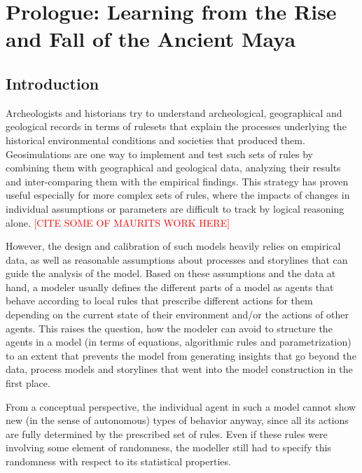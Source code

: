 \chapter{Prologue: Learning from the Rise and Fall of the Ancient Maya}
\label{chapter:maya}

\section{Introduction}

Archeologists and historians try to understand archeological, geographical and geological records in terms of rulesets that explain the processes underlying the historical environmental conditions and societies that produced them.
Geosimulations are one way to implement and test such sets of rules by combining them with geographical and geological data, analyzing their results and inter-comparing them with the empirical findings. This strategy has proven useful especially for more complex sets of rules, where the impacts of changes in individual assumptions or parameters are difficult to track by logical reasoning alone. \textcolor{red}{[CITE SOME OF MAURITS WORK HERE]}

However, the design and calibration of such models heavily relies on empirical data, as well as reasonable assumptions about processes and storylines that can guide the analysis of the model. Based on these assumptions and the data at hand, a modeler usually defines the different parts of a model as agents that behave according to local rules that prescribe different actions for them depending on the current state of their environment and/or the actions of other agents. This raises the question, how the modeler can avoid to structure the agents in a model (in terms of equations, algorithmic rules and parametrization) to an extent that prevents the model from generating insights that go beyond the data, process models and storylines that went into the model construction in the first place.

From a conceptual perspective, the individual agent in such a model cannot show new (in the sense of autonomous) types of behavior anyway, since all its actions are fully determined by the prescribed set of rules. Even if these rules were involving some element of randomness, the modeller still had to specify this randomness with respect to its statistical properties. 

